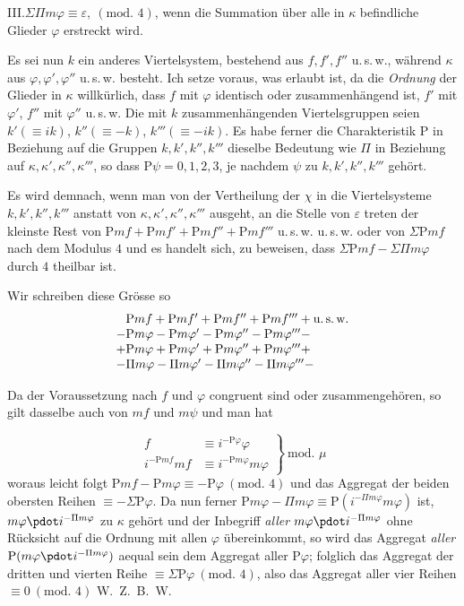 III.\quad $\Sigma\Pi m\varphi\equiv\varepsilon,\ (\text{mod. }4)$, wenn die Summation über alle in $\kappa$ befindliche Glieder $\varphi$ erstreckt wird.

Es sei nun $k$ ein anderes Viertelsystem, bestehend aus $f,f',f''$ u.\,s.\,w., während $\kappa$ aus $\varphi,\varphi',\varphi''$ u.\,s.\,w. besteht. Ich setze voraus, was erlaubt ist, da die \emph{Ordnung} der Glieder in $\kappa$ willkürlich, dass $f$ mit $\varphi$ identisch oder zusammenhängend ist, $f'$ mit $\varphi'$, $f''$ mit $\varphi''$ u.\,s.\,w. Die mit $k$ zusammenhängenden Viertelsgruppen seien $k'(\equiv ik)$, $k''(\equiv-k)$, $k'''(\equiv-ik)$. Es habe ferner die Charakteristik $\mathrm{P}$ in Beziehung auf die Gruppen $k,k',k'',k'''$ dieselbe Bedeutung wie $\Pi$ in Beziehung auf $\kappa,\kappa',\kappa'',\kappa'''$, so dass $\mathrm{P}\psi=0,1,2,3$, je nachdem $\psi$ zu $k,k',k'',k'''$ gehört.

Es wird demnach, wenn man von der Vertheilung der $\chi$ in die Viertelsysteme $k,k',k'',k'''$ anstatt von $\kappa,\kappa',\kappa'',\kappa'''$ ausgeht, an die Stelle von $\varepsilon$ treten der kleinste Rest von $\mathrm{P}mf+\mathrm{P}mf'+\mathrm{P}mf''+\mathrm{P}mf'''$ u.\,s.\,w. u.\,s.\,w. oder von $\Sigma\mathrm{P}mf$ nach dem Modulus $4$ und es handelt sich, zu beweisen, dass $\Sigma\mathrm{P}mf-\Sigma\Pi m\varphi$ durch $4$ theilbar ist.

Wir schreiben diese Grösse so
\[
\begin{array}{l}
\phantom{+}\mathrm{P}mf+\mathrm{P}mf'+\mathrm{P}mf''+\mathrm{P}mf'''+\text{u.\,s.\,w.}\\
-\mathrm{P}m\varphi-\mathrm{P}m\varphi'-\mathrm{P}m\varphi''-\mathrm{P}m\varphi'''-\\
+\mathrm{P}m\varphi+\mathrm{P}m\varphi'+\mathrm{P}m\varphi''+\mathrm{P}m\varphi'''+\\
-\Pi m\varphi-\Pi m\varphi'-\Pi m\varphi''-\Pi m\varphi'''-
\end{array}
\]

Da der Voraussetzung nach $f$ und $\varphi$ congruent sind oder zusammengehören, so gilt dasselbe auch von $mf$ und $m\psi$ und man hat

\[
\left.\begin{aligned}
f&\equiv i^{-\mathrm{P}\varphi}\varphi\\
i^{-\mathrm{P}mf}mf&\equiv i^{-\mathrm{P}m\varphi}m\varphi
\end{aligned}\right\}\ \text{mod. }\mu
\]
woraus leicht folgt $\mathrm{P}mf-\mathrm{P}m\varphi\equiv-\mathrm{P}\varphi\ (\text{mod. }4)$ und das Aggregat der beiden obersten Reihen $\equiv-\Sigma\mathrm{P}\varphi$. Da nun ferner $\mathrm{P}m\varphi-\Pi m\varphi\equiv\mathrm{P}(i^{-\Pi m\varphi}m\varphi)$ ist, $m\varphi\pdot i^{-\Pi m\varphi}$ zu $\kappa$ gehört und der Inbegriff \emph{aller} $m\varphi\pdot i^{-\Pi m\varphi}$ ohne Rücksicht auf die Ordnung mit allen $\varphi$ übereinkommt, so wird das Aggregat \emph{aller} $\mathrm{P}(m\varphi\pdot i^{-\Pi m\varphi})$ aequal sein dem Aggregat aller $\mathrm{P}\varphi$; folglich das Aggregat der dritten und vierten Reihe $\equiv\Sigma\mathrm{P}\varphi\ (\text{mod. }4)$, also das Aggregat aller vier Reihen $\equiv0\ (\text{mod. }4)$ W.\ Z.\ B.\ W.


